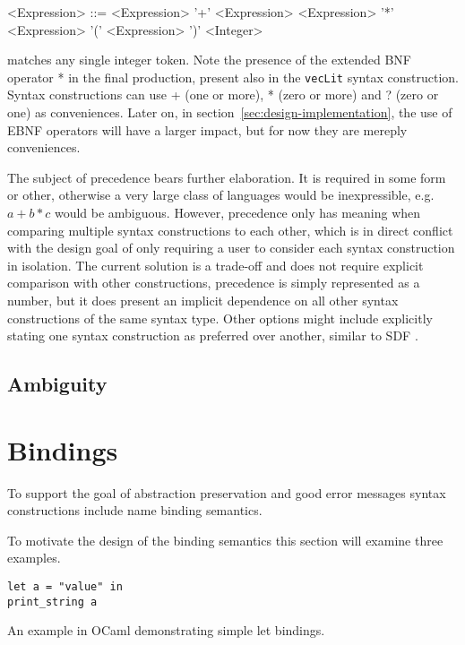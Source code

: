 \documentclass{kththesis}
\begin{document}
\begin{grammar}
<Expression> ::= <Expression> '+' <Expression>
  \alt <Expression> '*' <Expression>
  \alt '(' <Expression> ')'
  \alt <Integer>
\end{grammar}

 matches any single integer token. Note the presence of the extended BNF operator * in the final production, present also in the \texttt{vecLit} syntax construction. Syntax constructions can use + (one or more), * (zero or more) and ? (zero or one) as conveniences. Later on, in section~\ref{sec:design-implementation}, the use of EBNF operators will have a larger impact, but for now they are mereply conveniences.

The subject of precedence bears further elaboration. It is required in some form or other, otherwise a very large class of languages would be inexpressible, e.g. $a + b * c$ would be ambiguous. However, precedence only has meaning when comparing multiple syntax constructions to each other, which is in direct conflict with the design goal of only requiring a user to consider each syntax construction in isolation. The current solution is a trade-off and does not require explicit comparison with other constructions, precedence is simply represented as a number, but it does present an implicit dependence on all other syntax constructions of the same syntax type. Other options might include explicitly stating one syntax construction as preferred over another, similar to SDF \cite{Heering1989}.

\subsection{Ambiguity}



\section{Bindings} \label{sec:design-bindings}

To support the goal of abstraction preservation and good error messages syntax constructions include name binding semantics.

To motivate the design of the binding semantics this section will examine three examples.

\begin{listing}
\begin{verbatim}
let a = "value" in
print_string a
\end{verbatim}
\caption{An example in OCaml demonstrating simple let bindings.}
\label{lst:nested-binding-example}
\end{listing}
\end{document}
